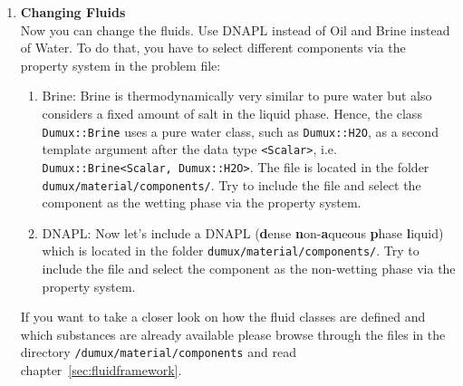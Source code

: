 \begin{enumerate}
\item \textbf{Changing Fluids} \\
Now you can change the fluids. Use DNAPL instead of Oil and Brine instead of Water. To do that, you have to select different components via the property system in the problem file:
\begin{enumerate}
 \item Brine: Brine is thermodynamically very similar to pure water but also considers a fixed amount of salt in the liquid phase. 
  Hence, the class \texttt{Dumux::Brine} uses a pure water class, such as \texttt{Dumux::H2O}, 
  as a second template argument after the data type \texttt{<Scalar>}, i.e. \texttt{Dumux::Brine<Scalar, Dumux::H2O>}. The file is located in the folder \texttt{dumux/material/components/}.
  Try to include the file and select the component as the wetting phase via the property system.
 \item DNAPL:  
  Now let's include a DNAPL (\textbf{d}ense \textbf{n}on-\textbf{a}queous \textbf{p}hase \textbf{l}iquid)
  which is located in the folder \texttt{dumux/material/components/}. Try to include the file and select the component as the non-wetting phase via the property system.
\end{enumerate}
If you want to take a closer look on how the fluid classes are defined and which substances are already available please browse through the files in the directory
\texttt{/dumux/material/components} and read chapter~\ref{sec:fluidframework}.


\end{enumerate}
